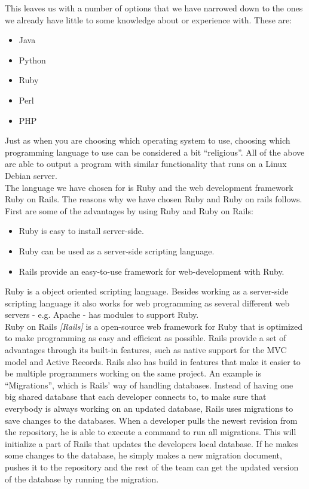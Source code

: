 This leaves us with a number of options that we have narrowed down to the ones we already have little to some knowledge about or experience with.
These are:
\begin{itemize}
    \item Java
    \item Python
    \item Ruby
    \item Perl
    \item PHP
\end{itemize}

Just as when you are choosing which operating system to use, choosing which programming language to use can be considered a bit ``religious''.
All of the above are able to output a program with similar functionality that runs on a Linux Debian server.\\

The language we have chosen for \projectname{} is Ruby and the web development framework Ruby on Rails.
The reasons why we have chosen Ruby and Ruby on rails follows.
First are some of the advantages by using Ruby and Ruby on Rails:

\begin{itemize}
    \item Ruby is easy to install server-side.
    \item Ruby can be used as a server-side scripting language.
    \item Rails provide an easy-to-use framework for web-development with Ruby.
\end{itemize}

Ruby is a object oriented scripting language.
Besides working as a server-side scripting language it also works for web programming as several different web servers - e.g. Apache - has modules to support Ruby. \\

Ruby on Rails \emph{[Rails]} is a open-source web framework for Ruby that is optimized to make programming as easy and efficient as possible.
Rails provide a set of advantages through its built-in features, such as native support for the MVC model and Active Records.
Rails also has build in features that make it easier to be multiple programmers working on the same project.
An example is ``Migrations'', which is Rails' way of handling databases.
Instead of having one big shared database that each developer connects to, to make sure that everybody is always working on an updated database, Rails uses migrations to save changes to the databases.
When a developer pulls the newest revision from the repository, he is able to execute a command to run all migrations.
This will initialize a part of Rails that updates the developers local database.
If he makes some changes to the database, he simply makes a new migration document, pushes it to the repository and the rest of the team can get the updated version of the database by running the migration.\\

